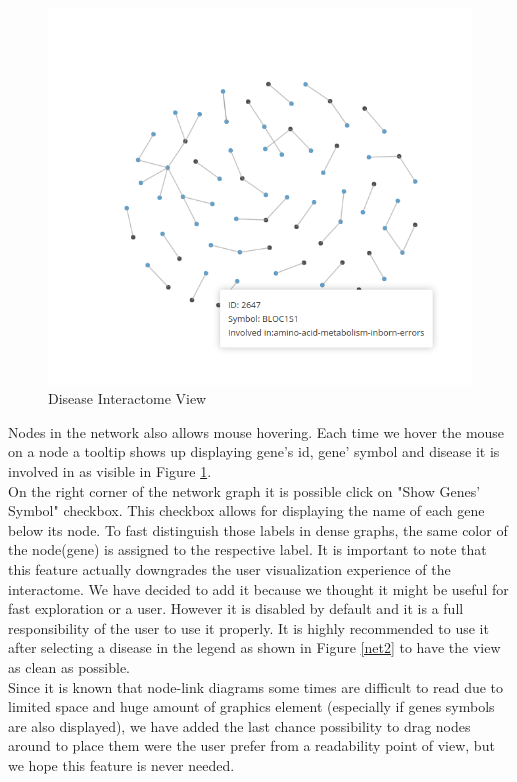 \documentclass[12pt,twocolumn,twoside]{article}
\begin{document}
\begin{figure}
	\includegraphics[width=.95\linewidth]{network.png}
	\caption{Disease Interactome View}
	\label{net}
\end{figure}

Nodes in the network also allows mouse hovering. Each time we hover the mouse on a node a tooltip shows up displaying gene's id, gene' symbol and disease it is involved in as visible in Figure \ref{net}.\\


On the right corner of the network graph it is possible  click on "Show Genes' Symbol" checkbox. This checkbox allows for displaying the name of each gene below its node. To fast distinguish those labels in dense graphs, the same color of the node(gene) is assigned to the respective label. It is important to note that this feature actually downgrades the user visualization experience of the interactome. We have decided to add it because we thought it might be useful for fast exploration or a user. However it is disabled by default and it is a full responsibility of the user to use it properly. It is highly recommended to use it after selecting a disease in the legend as shown in Figure \ref{net2} to have the view as clean as possible.\\ 
Since it is known that node-link diagrams some times are difficult to read due to limited space and huge amount of graphics element (especially if genes symbols are also displayed), we have added the last chance possibility to drag nodes around to place them were the user prefer from a readability point of view, but we hope this feature is never needed.
\end{document}
